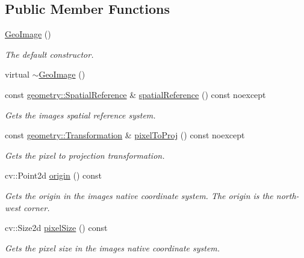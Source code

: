 \subsection*{Public Member Functions}
\begin{DoxyCompactItemize}
\item 
\hyperlink{classdg_1_1deepcore_1_1imagery_1_1_geo_image_ac979ae795537b25cca57b032e7b81264}{Geo\+Image} ()
\begin{DoxyCompactList}\small\item\em The default constructor. \end{DoxyCompactList}\item 
virtual \hyperlink{classdg_1_1deepcore_1_1imagery_1_1_geo_image_a19a94ac81d6f9c7bab7cacff63650198}{$\sim$\+Geo\+Image} ()
\item 
const \hyperlink{classdg_1_1deepcore_1_1geometry_1_1_spatial_reference}{geometry\+::\+Spatial\+Reference} \& \hyperlink{group___imagery_module_ga6953ff30d8f1791b3bcf886ad5fa0023}{spatial\+Reference} () const noexcept
\begin{DoxyCompactList}\small\item\em Gets the image\textquotesingle{}s spatial reference system. \end{DoxyCompactList}\item 
const \hyperlink{structdg_1_1deepcore_1_1geometry_1_1_transformation}{geometry\+::\+Transformation} \& \hyperlink{classdg_1_1deepcore_1_1imagery_1_1_geo_image_a8791e3e5c7fcbdcdbf485898047a4664}{pixel\+To\+Proj} () const noexcept
\begin{DoxyCompactList}\small\item\em Gets the pixel to projection transformation. \end{DoxyCompactList}\item 
cv\+::\+Point2d \hyperlink{group___imagery_module_ga7c5610e7c7709c34712d1787c0009463}{origin} () const 
\begin{DoxyCompactList}\small\item\em Gets the origin in the image\textquotesingle{}s native coordinate system. The origin is the north-\/west corner. \end{DoxyCompactList}\item 
cv\+::\+Size2d \hyperlink{group___imagery_module_gad29b678ab57f8baf38e0d2060483c853}{pixel\+Size} () const 
\begin{DoxyCompactList}\small\item\em Gets the pixel size in the image\textquotesingle{}s native coordinate system. \end{DoxyCompactList}\item 

\end{DoxyCompactItemize}
